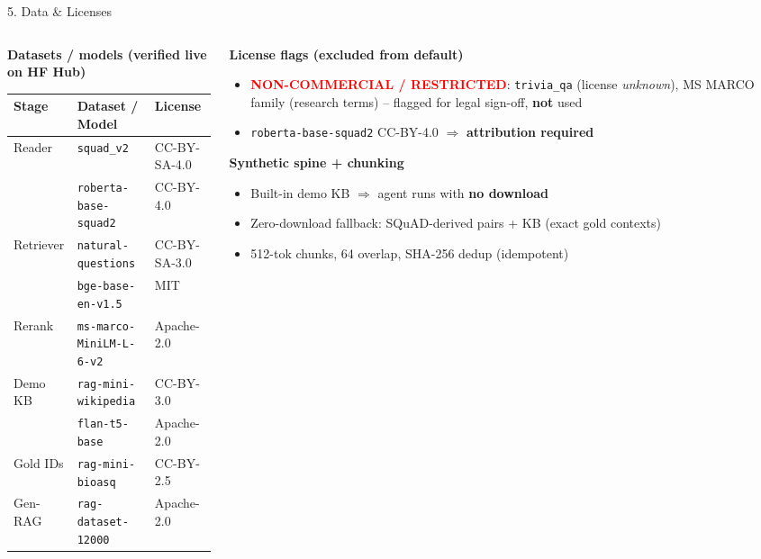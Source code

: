 \documentclass[10pt,aspectratio=169]{beamer}
\begin{document}
\begin{frame}{5. Data \& Licenses}
\begin{columns}[T]
\begin{column}{0.56\textwidth}
\textbf{Datasets / models (verified live on HF Hub)}
\begin{table}[h]
\centering\tiny
\begin{tabular}{lll}
\toprule
\textbf{Stage} & \textbf{Dataset / Model} & \textbf{License} \\
\midrule
Reader & \texttt{squad\_v2} & CC-BY-SA-4.0 \\
       & \texttt{roberta-base-squad2} & CC-BY-4.0 \\
Retriever & \texttt{natural-questions} & CC-BY-SA-3.0 \\
          & \texttt{bge-base-en-v1.5} & MIT \\
Rerank & \texttt{ms-marco-MiniLM-L-6-v2} & Apache-2.0 \\
Demo KB & \texttt{rag-mini-wikipedia} & CC-BY-3.0 \\
        & \texttt{flan-t5-base} & Apache-2.0 \\
Gold IDs & \texttt{rag-mini-bioasq} & CC-BY-2.5 \\
Gen-RAG & \texttt{rag-dataset-12000} & Apache-2.0 \\
\bottomrule
\end{tabular}
\end{table}
\end{column}
\begin{column}{0.44\textwidth}
\textbf{License flags (excluded from default)}
\begin{itemize}\scriptsize
  \item \textcolor{red}{\textbf{NON-COMMERCIAL / RESTRICTED}}: \texttt{trivia\_qa} (license \emph{unknown}), MS MARCO family (research terms) -- flagged for legal sign-off, \textbf{not} used
  \item \texttt{roberta-base-squad2} CC-BY-4.0 $\Rightarrow$ \textbf{attribution required}
\end{itemize}

\vspace{0.1cm}
\textbf{Synthetic spine + chunking}
\begin{itemize}\scriptsize
  \item Built-in demo KB $\Rightarrow$ agent runs with \textbf{no download}
  \item Zero-download fallback: SQuAD-derived pairs + KB (exact gold contexts)
  \item 512-tok chunks, 64 overlap, SHA-256 dedup (idempotent)
\end{itemize}
\end{column}
\end{columns}
\end{frame}
\end{document}
